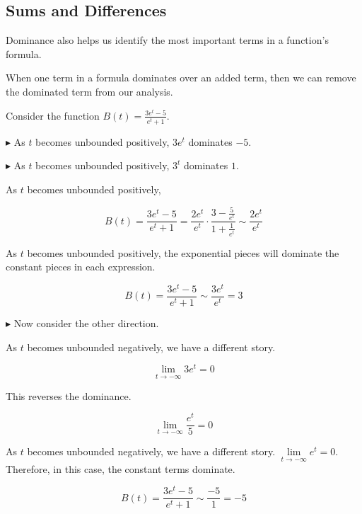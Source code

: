 \documentclass{ximera}
\begin{document}
\subsection*{Sums and Differences}


Dominance also helps us identify the most important terms in a function's formula.


When one term in a formula dominates over an added term, then we can remove the dominated term from our analysis. 






\begin{example}

Consider the function $B(t) = \frac{3e^t - 5}{e^t + 1}$. 


$\blacktriangleright$ As $t$ becomes unbounded positively, $3e^t$ dominates $-5$. 

$\blacktriangleright$ As $t$ becomes unbounded positively, $3^t$ dominates $1$. 

As $t$ becomes unbounded positively,

\[
B(t) = \frac{3e^t - 5}{e^t + 1} = \frac{2 e^t}{e^t} \cdot \frac{3 - \tfrac{5}{e^t}}{1 + \tfrac{1}{e^t}} \sim \frac{2 e^t}{e^t}
\]

As $t$ becomes unbounded positively, the exponential pieces will dominate the constant pieces in each expression.  

\[   B(t) = \frac{3e^t - 5}{e^t + 1} \sim \frac{3 e^t}{e^t} = 3   \]




\textbf{\textcolor{blue!55!black}{$\blacktriangleright$}} Now consider the other direction. 


As $t$ becomes unbounded negatively, we have a different story.   



\[   \lim\limits_{t \to -\infty} 3 e^t  = 0  \]


This reverses the dominance.


\[   \lim\limits_{t \to -\infty} \frac{e^t}{5} = 0   \]



As $t$ becomes unbounded negatively, we have a different story.  $\lim\limits_{t \to -\infty} e^t = 0$. Therefore, in this case, the constant terms dominate.


\[   B(t) = \frac{3e^t - 5}{e^t + 1} \sim \frac{-5}{1} = -5   \]








\end{example}
\end{document}
